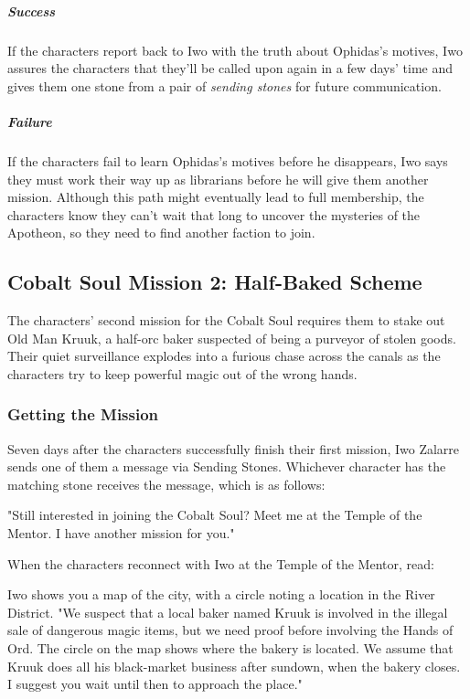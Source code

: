 \documentclass[10pt,a4paper,twoside,bg=print,twocolumn,openany,nodeprecatedcode]{dndbook}
\begin{document}
\subparagraph{Success}
If the characters report back to Iwo with the truth about Ophidas's motives, Iwo assures the characters that they'll be called upon again in a few days' time and gives them one stone from a pair of \textit{sending stones} for future communication.

\subparagraph{Failure}
If the characters fail to learn Ophidas's motives before he disappears, Iwo says they must work their way up as librarians before he will give them another mission. Although this path might eventually lead to full membership, the characters know they can't wait that long to uncover the mysteries of the Apotheon, so they need to find another faction to join.

\subsection{Cobalt Soul Mission 2: Half-Baked Scheme}
The characters' second mission for the Cobalt Soul requires them to stake out Old Man Kruuk, a half-orc baker suspected of being a purveyor of stolen goods. Their quiet surveillance explodes into a furious chase across the canals as the characters try to keep powerful magic out of the wrong hands.

\subsubsection{Getting the Mission}
Seven days after the characters successfully finish their first mission, Iwo Zalarre sends one of them a message via Sending Stones. Whichever character has the matching stone receives the message, which is as follows:

\begin{DndReadAloud}{}
"Still interested in joining the Cobalt Soul? Meet me at the Temple of the Mentor. I have another mission for you."

\end{DndReadAloud}

When the characters reconnect with Iwo at the Temple of the Mentor, read:

\begin{DndReadAloud}{}
Iwo shows you a map of the city, with a circle noting a location in the River District. "We suspect that a local baker named Kruuk is involved in the illegal sale of dangerous magic items, but we need proof before involving the Hands of Ord. The circle on the map shows where the bakery is located. We assume that Kruuk does all his black-market business after sundown, when the bakery closes. I suggest you wait until then to approach the place."

\end{DndReadAloud}
\end{document}
